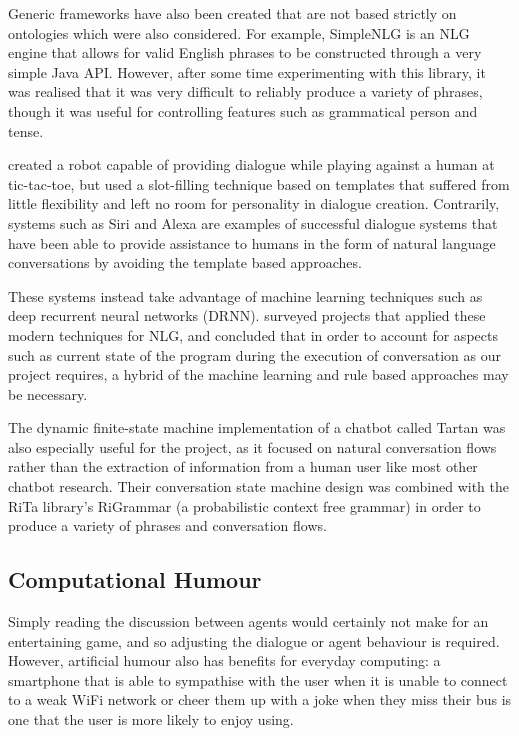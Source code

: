 \documentclass{article}
\begin{document}
Generic frameworks have also been created that are not based strictly on ontologies which were also considered. For example, SimpleNLG \cite{simplenlg} is an NLG engine that allows for valid English phrases to be constructed through a very simple Java API. However, after some time experimenting with this library, it was realised that it was very difficult to reliably produce a variety of phrases, though it was useful for controlling features such as grammatical person and tense.

\cite{robotgame} created a robot capable of providing dialogue while playing against a human at tic-tac-toe, but used a slot-filling technique based on templates that suffered from little flexibility and left no room for personality in dialogue creation. Contrarily, systems such as Siri and Alexa are examples of successful dialogue systems that have been able to provide assistance to humans in the form of natural language conversations by avoiding the template based approaches.

These systems instead take advantage of machine learning techniques such as deep recurrent neural networks (DRNN). \cite{dialoguesystems} surveyed projects that applied these modern techniques for NLG, and concluded that in order to account for aspects such as current state of the program during the execution of conversation as our project requires, a hybrid of the machine learning and rule based approaches may be necessary. 

The dynamic finite-state machine implementation of a chatbot called Tartan \cite{tartan} was also especially useful for the project, as it focused on natural conversation flows rather than the extraction of information from a human user like most other chatbot research. Their conversation state machine design was combined with the RiTa library's RiGrammar (a probabilistic context free grammar) in order to produce a variety of phrases and conversation flows. 

\subsection{Computational Humour}

Simply reading the discussion between agents would certainly not make for an entertaining game, and so adjusting the dialogue or agent behaviour is required. However, artificial humour also has benefits for everyday computing: a smartphone that is able to sympathise with the user when it is unable to connect to a weak WiFi network or cheer them up with a joke when they miss their bus is one that the user is more likely to enjoy using. 
\end{document}

